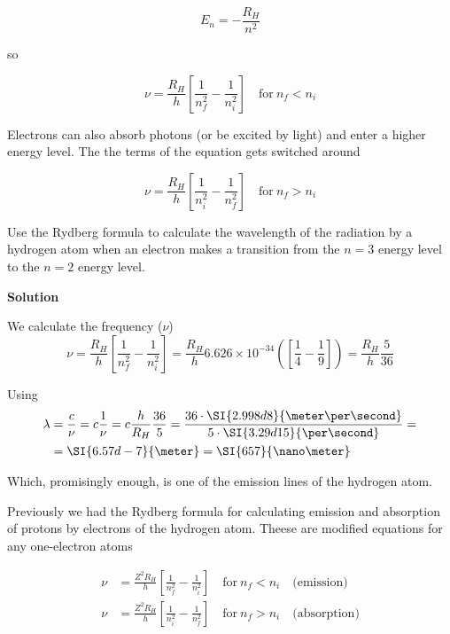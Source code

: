 \documentclass[../mit-general-chemistry.tex]{subfiles}
\begin{document}
\begin{equation}
  E_n = -\frac{R_H}{n^2}
\end{equation}

so

\begin{equation}
  \nu = \frac{R_H}{h} \left[ \frac{1}{n^2_f}-\frac{1}{n^2_i} \right]
  \quad\text{for}~n_f < n_i
\end{equation}

Electrons can also absorb photons (or be excited by light) and enter a
higher energy level. The the terms of the equation gets switched
around

\begin{equation}
  \nu = \frac{R_H}{h} \left[ \frac{1}{n^2_i}-\frac{1}{n^2_f} \right]
  \quad\text{for}~n_f > n_i
\end{equation}




\begin{example}
  Use the Rydberg formula to calculate the wavelength of the radiation
  by a hydrogen atom when an electron makes a transition from the $n =
  3$ energy level to the $n = 2$ energy level.

  \textbf{Solution}

  We calculate the frequency ($\nu$)
  \begin{equation*}
    \nu = \frac{R_H}{h} \left[ \frac{1}{n^2_f}-\frac{1}{n^2_i} \right]
    = \frac{R_H}{h}{6.626\times 10^{-34}}
    \left(
    \left[ \frac{1}{4}-\frac{1}{9} \right]
    \right) = \frac{R_H}{h}\frac{5}{36}
  \end{equation*}

  Using
  \begin{align*}
    \lambda &= \frac{c}{\nu} = c \frac{1}{\nu}
    = c \frac{h}{R_H}\frac{36}{5} =
    \frac{36 \cdot \SI{2.998d8}{\meter\per\second}}
         {5\cdot \SI{3.29d15}{\per\second}} = \\
         &= \SI{6.57d-7}{\meter} = \SI{657}{\nano\meter} \\
  \end{align*}

  Which, promisingly enough, is one of the emission lines of the
  hydrogen atom.
\end{example}


Previously we had the Rydberg formula for calculating emission and
absorption of protons by electrons of the hydrogen atom. Theese are
modified equations for any one-electron atoms

\begin{align}
  \nu &= \frac{Z^2 R_H}{h} \left[ \frac{1}{n^2_f}-\frac{1}{n^2_i} \right]
  \quad\text{for}~n_f < n_i  \quad\text{(emission)} \\
  \nu &= \frac{Z^2 R_H}{h} \left[ \frac{1}{n^2_i}-\frac{1}{n^2_f} \right]
  \quad\text{for}~n_f > n_i \quad\text{(absorption)}
\end{align}
\end{document}
